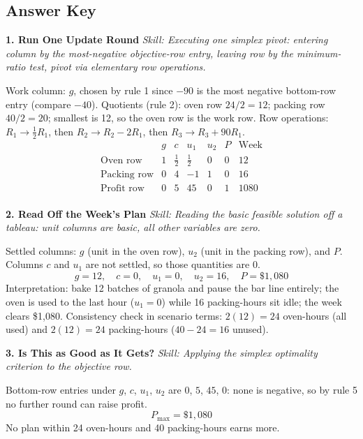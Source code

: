 \documentclass[11pt]{article}
\newcommand{\skill}[1]{{\small\textit{Skill: #1}}\par}
\begin{document}
\subsection*{Answer Key}

\begin{keybox}
\textbf{1. Run One Update Round}
\skill{Executing one simplex pivot: entering column by the most-negative objective-row entry, leaving row by the minimum-ratio test, pivot via elementary row operations.}
Work column: $g$, chosen by rule 1 since $-90$ is the most negative bottom-row entry
(compare $-40$). Quotients (rule 2): oven row $24/2 = 12$; packing row $40/2 = 20$;
smallest is 12, so the oven row is the work row.
Row operations: $R_1 \to \tfrac{1}{2}R_1$, then $R_2 \to R_2 - 2R_1$, then
$R_3 \to R_3 + 90R_1$.
\[
\boxed{\begin{array}{l|rrrrr|r}
 & g & c & u_1 & u_2 & P & \text{Week} \\
\hline
\text{Oven row} & 1 & \tfrac{1}{2} & \tfrac{1}{2} & 0 & 0 & 12 \\
\text{Packing row} & 0 & 4 & -1 & 1 & 0 & 16 \\
\text{Profit row} & 0 & 5 & 45 & 0 & 1 & 1080 \\
\end{array}}
\]

\medskip
\textbf{2. Read Off the Week's Plan}
\skill{Reading the basic feasible solution off a tableau: unit columns are basic, all other variables are zero.}
Settled columns: $g$ (unit in the oven row), $u_2$ (unit in the packing row), and $P$.
Columns $c$ and $u_1$ are not settled, so those quantities are 0.
\[
\boxed{\,g = 12, \quad c = 0, \quad u_1 = 0, \quad u_2 = 16, \quad P = \$1{,}080\,}
\]
Interpretation: bake 12 batches of granola and pause the bar line entirely; the oven is
used to the last hour ($u_1 = 0$) while 16 packing-hours sit idle; the week clears
\$1{,}080. Consistency check in scenario terms: $2(12) = 24$ oven-hours (all used) and
$2(12) = 24$ packing-hours ($40 - 24 = 16$ unused).

\medskip
\textbf{3. Is This as Good as It Gets?}
\skill{Applying the simplex optimality criterion to the objective row.}
Bottom-row entries under $g$, $c$, $u_1$, $u_2$ are $0$, $5$, $45$, $0$: none is
negative, so by rule 5 no further round can raise profit.
\[
\boxed{\,P_{\max} = \$1{,}080\,}
\]
No plan within 24 oven-hours and 40 packing-hours earns more.


\end{keybox}
\end{document}
